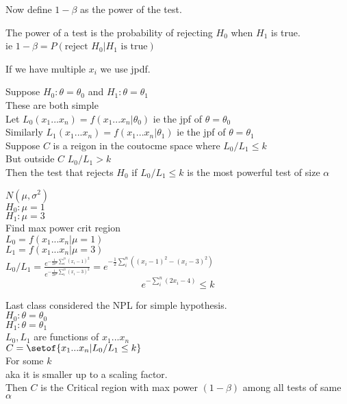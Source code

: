 \documentclass[answers,12pt,addpoints]{exam}
\begin{document}
Now define $1-\beta$ as the power of the test.\\
\begin{definition}
    The power of a test is the probability of rejecting $H_0$ when $H_1$ is true.\\
    ie $1 - \beta = P(\text{reject } H_0 | H_1 \text{ is true})$
\end{definition}
If we have multiple $x_i$ we use jpdf. \\
\begin{definition}
    Suppose $H_0: \theta = \theta_0$ and $H_1: \theta = \theta_1$\\
    These are both simple\\
    Let $L_0(x_1 ... x_n) = f(x_1 ... x_n | \theta_0)$ ie the jpf of $\theta = \theta_0$\\
    Similarly $L_1(x_1 ... x_n) = f(x_1 ... x_n | \theta_1)$ ie the jpf of $\theta = \theta_1$\\
    Suppose $C$ is a reigon in the coutocme space where $L_0/L_1 \leq k$\\
    But outside $C$ $L_0/L_1 > k$\\
    Then the test that rejects $H_0$ if $L_0/L_1 \leq k$ is the most powerful test of size $\alpha$
\end{definition}
\begin{example}
    $N(\mu, \sigma^2)$\\
    $H_0: \mu = 1$\\
    $H_1: \mu = 3$\\
    Find max power crit region\\
    $L_0 = f(x_1 ... x_n | \mu = 1)$\\
    $L_1 = f(x_1 ... x_n | \mu = 3)$\\
    $L_0/L_1 = \frac{e^{-\frac{1}{2\sigma^2} \sum_i^n (x_i - 1)^2}}{e^{-\frac{1}{2\sigma^2} \sum_i^n (x_i - 3)^2}} = e^{-\frac{1}{2}\sum_i^n\left( (x_i-1)^2 - (x_i-3)^2 \right)}$\\
    $$ e^{-\sum_i^n \left( 2x_i - 4 \right)} \leq k$$
\end{example}
\begin{definition}
    Last class considered the NPL for simple hypothesis.\\
    $H_0: \theta = \theta_0$\\
    $H_1: \theta = \theta_1$\\
    $L_0, L_1$ are functions of $x_1 ... x_n$\\
    $C = \setof{x_1 ... x_n | L_0/L_1 \leq k}$\\
    For some $k$\\
    aka it is smaller up to a scaling factor.\\
    Then $C$ is the Critical region with max power $(1- \beta)$ among all tests of same $\alpha$\\
\end{definition}
\end{document}
